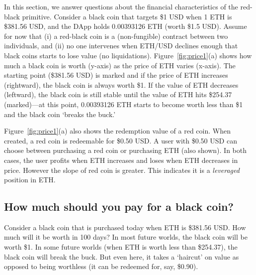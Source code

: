 In this section, we answer questions about the financial characteristics of the red-black primitive. Consider a black coin that targets \$1 USD when 1 ETH is \$381.56 USD, and the DApp holds 0.00393126 ETH (worth \$1.5 USD).  Assume for now that (i) a red-black coin is a (non-fungible) contract between two individuals, and (ii) no one intervenes when ETH/USD declines enough that black coins starts to lose value (no liquidations). Figure~\ref{fig:price1}(a) shows how much a black coin is worth (y-axis) as the price of ETH varies (x-axis). The starting point (\$381.56 USD) is marked and if the price of ETH increases (rightward), the black coin is always worth \$1. If the value of ETH decreases (leftward), the black coin is still stable until the value of ETH hits \$254.37 (marked)---at this point, 0.00393126 ETH starts to become worth less than \$1 and the black coin `breaks the buck.'

Figure~\ref{fig:price1}(a) also shows the redemption value of a red coin. When created, a red coin is redeemable for \$0.50 USD. A user with \$0.50 USD can choose between purchasing a red coin or purchasing ETH (also shown). In both cases, the user profits when ETH increases and loses when ETH decreases in price. However the slope of red coin is greater. This indicates it is a \emph{leveraged} position in ETH.  


\subsection{How much should you pay for a black coin?}

Consider a black coin that is purchased today when ETH is \$381.56 USD. How much will it be worth in 100 days? In most future worlds, the black coin will be worth \$1. In some future worlds (when ETH is worth less than \$254.37), the black coin will break the buck. But even here, it takes a `haircut' on value as opposed to being worthless (\eg it can be redeemed for, say, \$0.90). 

